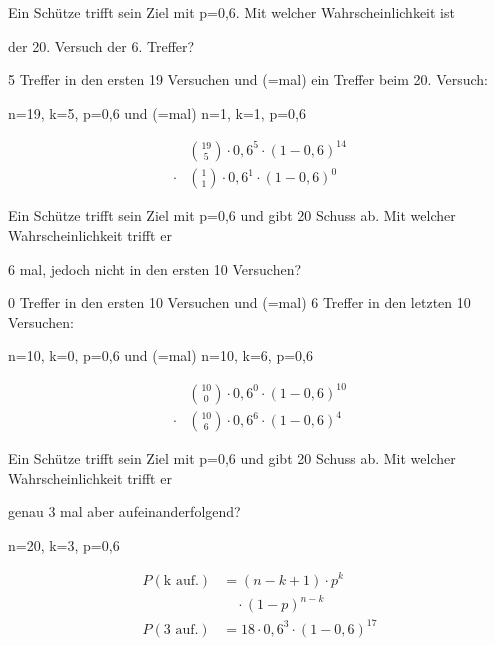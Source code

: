 \documentclass[paper=a6,landscape,ngerman,twoside=true,fontsize=12pt]{scrartcl}
\begin{document}
\begin{frage}
	\large
	Ein Schütze trifft sein Ziel mit p=0,6. Mit welcher Wahrscheinlichkeit ist 
	
	\LARGE 
	der 20. Versuch der 6. Treffer?
	
\end{frage}
\begin{antwort}
	5 Treffer in den ersten 19 Versuchen und (=mal) ein Treffer beim 20. Versuch:
	
	n=19, k=5, p=0,6 und (=mal) n=1, k=1, p=0,6
	
	\bigskip
	\begin{align*}
	&\binom{19}{5} \cdot 0,6^{5} \cdot (1-0,6)^{14} \\
	\cdot &\binom{1}{1} \cdot 0,6^{1} \cdot (1-0,6)^{0}
	\end{align*}
		
\end{antwort}
\begin{frage}
	\large
	Ein Schütze trifft sein Ziel mit p=0,6 und gibt 20 Schuss ab. Mit welcher Wahrscheinlichkeit trifft er  
	
	\LARGE 
	6 mal, jedoch nicht in den ersten 10 Versuchen?
	
\end{frage}
\begin{antwort}
	0 Treffer in den ersten 10 Versuchen und (=mal) 6 Treffer in den letzten 10 Versuchen:
	
	n=10, k=0, p=0,6 und (=mal) n=10, k=6, p=0,6
	
	\bigskip
	\begin{align*}
	&\binom{10}{0} \cdot 0,6^{0} \cdot (1-0,6)^{10} \\
	\cdot &\binom{10}{6} \cdot 0,6^{6} \cdot (1-0,6)^{4}
	\end{align*}
	
\end{antwort}
\begin{frage}
	\large
	Ein Schütze trifft sein Ziel mit p=0,6 und gibt 20 Schuss ab. Mit welcher Wahrscheinlichkeit trifft er 
	
	\LARGE 
	genau 3 mal aber aufeinanderfolgend?
	
\end{frage}
\begin{antwort}
	n=20, k=3, p=0,6
	
	\bigskip
	\begin{align*}
	P(\text{k auf.})&=(n-k+1)\cdot p^{k}\\
	&\quad\cdot (1-p)^{n-k} \\
	P(\text{3 auf.})&=18\cdot 0,6^{3} \cdot (1-0,6)^{17}
	\end{align*}
	
\end{antwort}
\end{document}
